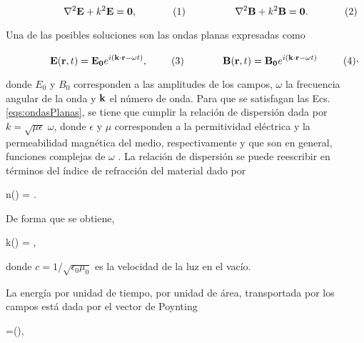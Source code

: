 	\begin{subequations}%
	\eqhalf{\nabla^2\vb{E} + k^2 \vb{E}=\vb{0},}%
	\eqhalf{\nabla^2\vb{B} + k^2 \vb{B}=\vb{0}.}\label{eq:Helmholtz}%
	\end{subequations}\vspace*{-1em}

\noindent Una de las posibles soluciones son las ondas planas expresadas como 

	\begin{subequations}%
	\eqhalf{\vb{E}(\vb{r},t) =\vb{E_0}e^{i(\vb{k}\cdot\vb{r} -\omega t)},}%
	\eqhalf{\vb{B}(\vb{r}, t) =\vb{B_0}e^{i(\vb{k}\cdot\vb{r} -\omega t)}},	
	\label{eqs:ondasPlanas}\end{subequations}\vspace*{-1em}
		
\noindent donde $E_0$ y $B_0$ corresponden a las amplitudes de los campos, $\omega$ la frecuencia angular de la onda y $\vb{k}$ el número de onda. Para que se satisfagan las Ecs. \eqref{eqs:ondasPlanas}, se tiene que cumplir la relación de dispersión dada por $k=\sqrt{\mu\epsilon}\;\omega$, donde $\epsilon$ y $\mu$ corresponden a la permitividad eléctrica y la permeabilidad magnética del medio, respectivamente y que son en general, funciones complejas de $\omega$ \cite{jacksonClassicalElectrodynamics2021}. La relación de dispersión se puede reescribir en términos del índice de refracción del material dado por
%
	\begin{tcolorbox}
				n(\omega) = .
			\label{eq:indice} 
		\end{tcolorbox}

%	
\noindent De forma que se obtiene,
%

%
\begin{tcolorbox}
	k(\omega) = ,
	\label{eq:indice} 
\end{tcolorbox}

\noindent donde $c=1/\sqrt{\epsilon_0\mu_0}$ es la velocidad de la luz en el vacío.

La energía por unidad de tiempo, por unidad de área, transportada por los campos está dada por el vector de Poynting \cite{griffithsIntroductionElectrodynamics2023}
\begin{tcolorbox}
	=(\times{}),
	\label{eq:indice} 
\end{tcolorbox}


